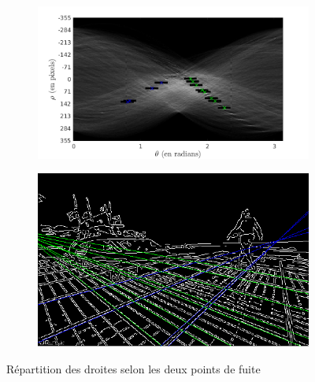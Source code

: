 \documentclass{article}
\begin{document}
\begin{figure}[!ht]
    \centering
    \begin{subfigure}[c]{0.49\linewidth}
        \centering
        \includegraphics[width=\linewidth]{images/5-C_repartition.png}
    \end{subfigure}
    \hfill
    \begin{subfigure}[c]{0.49\linewidth}
        \centering
        \includegraphics[width=\linewidth]{images/5-lines_repartition.png}
    \end{subfigure}
    \caption{Répartition des droites selon les deux points de fuite}
    \label{5-T-grand}
\end{figure}
\end{document}
